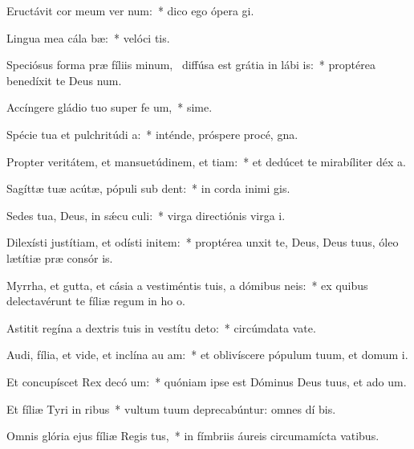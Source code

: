 \item Eructávit cor meum ver num:~* dico ego ópera  gi.
\item Lingua mea cála bæ:~* velóci tis.
\item Speciósus forma præ fíliis minum,~\pscross{} diffúsa est grátia in lábi is:~* proptérea benedíxit te Deus  num.
\item Accíngere gládio tuo super fe um,~* sime.
\item Spécie tua et pulchritúdi a:~* inténde, próspere procé,  gna.
\item Propter veritátem, et mansuetúdinem, et tiam:~* et dedúcet te mirabíliter déx a.
\item Sagíttæ tuæ acútæ, pópuli sub  dent:~* in corda inimi gis.
\item Sedes tua, Deus, in sǽcu culi:~* virga directiónis virga  i.
\item Dilexísti justítiam, et odísti initem:~* proptérea unxit te, Deus, Deus tuus, óleo lætítiæ præ consór is.
\item Myrrha, et gutta, et cásia a vestiméntis tuis, a dómibus neis:~* ex quibus delectavérunt te fíliæ regum in ho o.
\item Astitit regína a dextris tuis in vestítu deto:~* circúmdata vate.
\item Audi, fília, et vide, et inclína au am:~* et oblivíscere pópulum tuum, et domum  i.
\item Et concupíscet Rex decó um:~* quóniam ipse est Dóminus Deus tuus, et ado um.
\item Et fíliæ Tyri in ribus~* vultum tuum deprecabúntur: omnes dí bis.
\item Omnis glória ejus fíliæ Regis  tus,~* in fímbriis áureis circumamícta vatibus.
